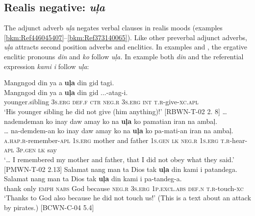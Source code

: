 \subsection{Realis negative: \textit{uļa}}
\label{bkm:Ref80510883} 
The adjunct adverb \textit{uļa} negates verbal clauses in realis moods (examples \ref{bkm:Ref446045407}--\ref{bkm:Ref373140065}). Like other preverbal adjunct adverbs, \textit{uļa} attracts second position adverbs and enclitics. In examples  and , the ergative enclitic pronouns \textit{din} and \textit{ko} follow \textit{uļa.} In example  both \textit{din} and the referential expression \textit{kami i} follow \textit{uļa}:

\ea
\label{bkm:Ref230081554}\label{bkm:Ref446045407}
Mangngod  din  ya  a  \textbf{uļa}  din  gid  tagi. \\\smallskip
\gll Mangngod  din  ya  a  \textbf{uļa}  din  gid  ...-atag-i. \\
younger.sibling  3\textsc{s.erg}  \textsc{def.f}  \textsc{ctr}  \textsc{neg.r}  3\textsc{s.erg}  \textsc{int}  \textsc{t.r}-give-\textsc{xc.apl} \\
\glt ‘His younger sibling he did not give (him anything)!’ [RBWN-T-02 2. 8]
\z
\ea
\label{bkm:Ref80941165}
… nademdeman  ko  inay  daw  amay  ko  na \textbf{uļa}  ko  pamatian  iran  na  ambaļ. \\\smallskip
\gll … na-demdem-an  ko  inay  daw  amay  ko  na \textbf{uļa}  ko  pa-mati-an  iran  na  ambaļ. \\
 {} \textsc{a.hap.r}-remember-\textsc{apl}  1\textsc{s.erg}  mother  and  father  1\textsc{s.gen}  \textsc{lk}
\textsc{neg.r}  1\textsc{s.erg}  \textsc{t.r}-hear-\textsc{apl}  3\textsc{p.gen}  \textsc{lk}  say \\
\glt ‘… I remembered my mother and father, that I did not obey what they said.’ [PMWN-T-02  2.13]
\z
\ea
\label{bkm:Ref80941209}
Salamat  nang  man  ta  Dios  tak  \textbf{uļa}  din  kami  i  patandega. \\\smallskip
\gll Salamat  nang  man  ta  Dios  tak  \textbf{uļa}  din  kami  i  pa-tandeg-a. \\
thank  only  \textsc{emph}  \textsc{nabs}  God  because  \textsc{neg.r}  3\textsc{s.erg}  1\textsc{p.excl.abs}  \textsc{def.n}  \textsc{t.r}-touch-\textsc{xc} \\
\glt ‘Thanks to God also because he did not touch us!’ (This is a text about an attack by pirates.) [BCWN-C-04 5.4]
\z

